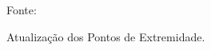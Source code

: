 \documentclass[xcolor=dvipsnames, aspectratio=169]{beamer}
\begin{document}
\begin{frame}
\begin{itemize}
\begin{figure}
        \begin{minipage}{0.31\textwidth}
            \centering
            {Fonte: \cite{buniyamin2011simple}}
            \caption{Atualização dos Pontos de Extremidade.}
            \label{fig:7}
        \end{minipage}
    \end{figure}

  \end{itemize}
\end{frame}
  

\end{document}
